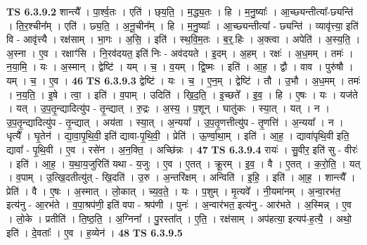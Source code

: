 \documentclass[17pt]{extarticle}
\begin{document}
                  \newline
                                \textbf{ TS 6.3.9.2} \newline
                  शान्त्यै᳚ । पा॒र्श्व॒तः । एति॑ । छ्‌य॒ति॒ । म॒द्ध्य॒तः । हि । म॒नु॒ष्याः᳚ । आ॒च्छ्यन्तीत्या᳚-छ्यन्ति॑ । ति॒र॒श्चीन᳚म् । एति॑ । छ्य॒ति॒ । अ॒नू॒चीन᳚म् । हि । म॒नु॒ष्याः᳚ । आ॒च्छ्यन्तीत्या᳚ - छ्यन्ति॑ । व्यावृ॑त्त्या॒ इति॑ वि - आवृ॑त्त्यै । रक्ष॑साम् । भा॒गः । अ॒सि॒ । इति॑ । स्थ॒वि॒म॒तः । ब॒र्॒.हिः । अ॒क्त्वा । अपेति॑ । अ॒स्य॒ति॒ । अ॒स्ना । ए॒व । रक्षाꣳ॑सि । नि॒रव॑दयत॒ इति॑ निः - अव॑दयते । इ॒दम् । अ॒हम् । रक्षः॑ । अ॒ध॒मम् । तमः॑ । न॒या॒मि॒ । यः । अ॒स्मान् । द्वेष्टि॑ । यम् । च॒ । व॒यम् । द्वि॒ष्मः । इति॑ । आ॒ह॒ । द्वौ । वाव । पुरु॑षौ । यम् । च॒ । ए॒व । \textbf{  46} \newline
                  \newline
                                \textbf{ TS 6.3.9.3} \newline
                  द्वेष्टि॑ । यः । च॒ । ए॒न॒म् । द्वेष्टि॑ । तौ । उ॒भौ । अ॒ध॒मम् । तमः॑ । न॒य॒ति॒ । इ॒षे । त्वा॒ । इति॑ । व॒पाम् । उदिति॑ । खि॒द॒ति॒ । इ॒च्छते᳚ । इ॒व॒ । हि । ए॒षः । यः । यज॑ते । यत् । उ॒प॒तृ॒न्द्यादित्यु॑प - तृ॒न्द्यात् । रु॒द्रः । अ॒स्य॒ । प॒शून् । घातु॑कः । स्या॒त् । यत् । न । उ॒प॒तृ॒न्द्यादित्यु॑प - तृ॒न्द्यात् । अय॑ता । स्या॒त् । अ॒न्यया᳚ । उ॒प॒तृ॒णत्तीत्यु॑प - तृ॒णत्ति॑ । अ॒न्यया᳚ । न । धृत्यै᳚ । घृ॒तेन॑ । द्या॒वा॒पृ॒थि॒वी॒ इति॑ द्यावा-पृ॒थि॒वी॒ । प्रेति॑ । ऊ॒र्ण्वा॒था॒म् । इति॑ । आ॒ह॒ । द्यावा॑पृथि॒वी इति॒ द्यावा᳚ - पृ॒थि॒वी । ए॒व । रसे॑न । अ॒न॒क्ति॒ । अच्छि॑न्नः । \textbf{  47} \newline
                  \newline
                                \textbf{ TS 6.3.9.4} \newline
                  रायः॑ । सु॒वीर॒ इति॑ सु - वीरः॑ । इति॑ । आ॒ह॒ । य॒था॒य॒जुरिति॑ यथा - य॒जुः । ए॒व । ए॒तत् । क्रू॒रम् । इ॒व॒ । वै । ए॒तत् । क॒रो॒ति॒ । यत् । व॒पाम् । उ॒त्खि॒दतीत्यु॑त् - खि॒दति॑ । उ॒रु । अ॒न्तरि॑क्षम् । अन्विति॑ । इ॒हि॒ । इति॑ । आ॒ह॒ । शान्त्यै᳚ । प्रेति॑ । वै । ए॒षः । अ॒स्मात् । लो॒कात् । च्य॒व॒ते॒ । यः । प॒शुम् । मृ॒त्यवे᳚ । नी॒यमा॑नम् । अ॒न्वा॒रभ॑त॒ इत्य॑नु - आ॒रभ॑ते । व॒पा॒श्रप॑णी॒ इति॑ वपा - श्रप॑णी । पुनः॑ । अ॒न्वार॑भत॒ इत्य॑नु - आर॑भते । अ॒स्मिन्न् । ए॒व । लो॒के । प्रतीति॑ । ति॒ष्ठ॒ति॒ । अ॒ग्निना᳚ । पु॒रस्ता᳚त् । ए॒ति॒ । रक्ष॑साम् । अप॑हत्या॒ इत्यप॑-ह॒त्यै॒ । अथो॒ इति॑ । दे॒वताः᳚ । ए॒व । ह॒व्येन॑ । \textbf{  48} \newline
                  \newline
                                \textbf{ TS 6.3.9.5} \newline
\end{document}

